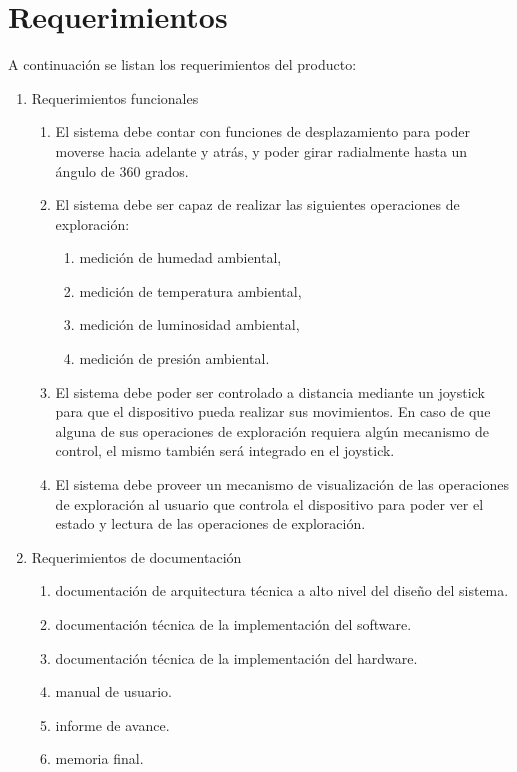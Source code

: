 \section{Requerimientos}
A continuación se listan los requerimientos del producto:
\begin{enumerate}	
	\item Requerimientos funcionales		
	\begin{enumerate}			
		\item El sistema debe contar con funciones de desplazamiento para poder moverse hacia adelante y atrás, y poder girar radialmente hasta un ángulo de 360 grados.			
		\item El sistema debe ser capaz de realizar las siguientes operaciones de exploración:			
			\begin{enumerate}				
				\item medición de humedad ambiental,				
				\item medición de temperatura ambiental,				
				\item medición de luminosidad ambiental,				
				\item medición de presión ambiental.			
			\end{enumerate}			
		\item El sistema debe poder ser controlado a distancia mediante un joystick para que el dispositivo pueda realizar sus movimientos. En caso de que alguna de sus operaciones de exploración requiera algún mecanismo de control, el mismo también será integrado en el joystick.		
		\item El sistema debe proveer un mecanismo de visualización de las operaciones de exploración al usuario que controla el dispositivo para poder ver el estado y lectura de las operaciones de exploración.		
		\end{enumerate}	
	\item Requerimientos de documentación		
		\begin{enumerate}			
			\item documentación de arquitectura técnica a alto nivel del diseño del sistema.			
			\item documentación técnica de la implementación del software.			
			\item documentación técnica de la implementación del hardware.			
			\item manual de usuario.	
			\item informe de avance.
			\item memoria final.	
		\end{enumerate}	

\end{enumerate}
